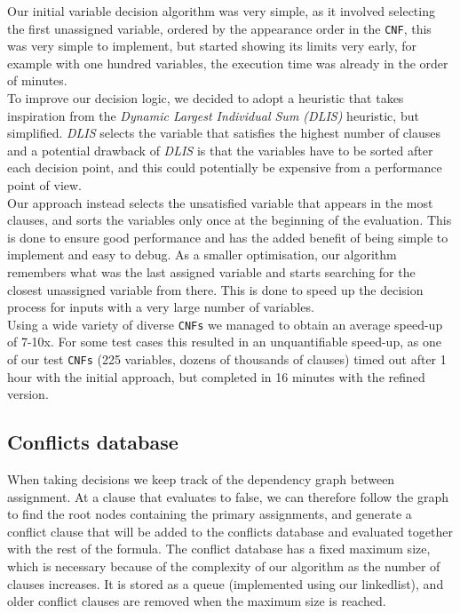 \documentclass[a4paper]{article}
\begin{document}
Our initial variable decision algorithm was very simple, as it involved selecting the first unassigned variable, ordered by the appearance order in the \texttt{CNF}, this was very simple to implement, but started showing its limits very early, for example with one hundred variables, the execution time was already in the order of minutes. \\

To improve our decision logic, we decided to adopt a heuristic that takes inspiration from the \emph{Dynamic Largest Individual Sum (DLIS)} heuristic, but simplified. \emph{DLIS} selects the variable that satisfies the highest number of clauses and a potential drawback of \emph{DLIS} is that the variables have to be sorted after each decision point, and this could potentially be expensive from a performance point of view. \\

Our approach instead selects the unsatisfied variable that appears in the most clauses, and sorts the variables only once at the beginning of the evaluation. This is done to ensure good performance and has the added benefit of being simple to implement and easy to debug.
As a smaller optimisation, our algorithm remembers what was the last assigned variable and starts searching for the closest unassigned variable from there. This is done to speed up the decision process for inputs with a very large number of variables. \\

Using a wide variety of diverse \texttt{CNFs} we managed to obtain an average speed-up of 7-10x. For some test cases this resulted in an unquantifiable speed-up, as one of our test \texttt{CNFs} (225 variables, dozens of thousands of clauses) timed out after 1 hour with the initial approach, but completed in 16 minutes with the refined version.

\subsection{Conflicts database}

When taking decisions we keep track of the dependency graph between assignment. At a clause that evaluates to false, we can therefore follow the graph to find the root nodes containing the primary assignments, and generate a conflict clause that will be added to the conflicts database and evaluated together with the rest of the formula. The conflict database has a fixed maximum size, which is necessary because of the complexity of our algorithm as the number of clauses increases. It is stored as a queue (implemented using our linkedlist), and older conflict clauses are removed when the maximum size is reached.
\end{document}
